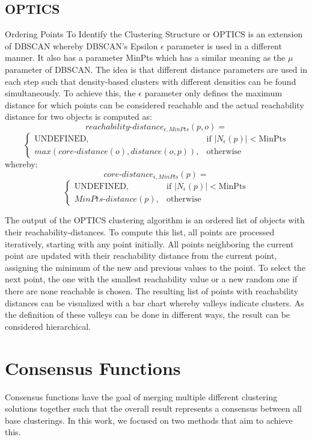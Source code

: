 \documentclass[
	a4paper,
	english,
	twoside,
	openright,               
	11pt                            
	]{report}
\begin{document}
\subsection{OPTICS}\label{sec:opticstheory}
Ordering Points To Identify the Clustering Structure or OPTICS \cite{10.1145/304181.304187} is an extension of DBSCAN whereby DBSCAN's Epsilon $\epsilon$ parameter is used in a different manner. It also has a parameter MinPts which has a similar meaning as the $\mu$ parameter of DBSCAN. The idea is that different distance parameters are used in each step such that density-based clusters with different densities can be found simultaneously. To achieve this, the  $\epsilon$ parameter only defines the maximum distance for which points can be considered reachable and the actual reachability distance for two objects is computed as:
$$reachability\text{-}distance_{\epsilon,MinPts}(p,o)=$$
$$
\begin{cases}
    \text{UNDEFINED},& \text{if } |N_\epsilon(p)|< \text{MinPts}\\
    max(core\text{-}distance(o),distance(o,p)),              & \text{otherwise}
\end{cases}
$$
whereby:
$$core\text{-}distance_{\epsilon,MinPts}(p)=$$
$$
\begin{cases}
    \text{UNDEFINED},& \text{if } |N_\epsilon(p)|< \text{MinPts}\\
    MinPts\text{-}distance(p),              & \text{otherwise}
\end{cases}
$$

The output of the OPTICS clustering algorithm is an ordered list of objects with their reachability-distances. To compute this list, all points are processed iteratively, starting with any point initially. All points neighboring the current point are updated with their reachability distance from the current point, assigning the minimum of the new and previous values to the point. To select the next point, the one with the smallest reachability value or a new random one if there are none reachable is chosen. The resulting list of points with reachability distances can be visualized with a bar chart whereby valleys indicate clusters. As the definition of these valleys can be done in different ways, the result can be considered hierarchical.


\section{Consensus Functions}
Consensus functions have the goal of merging multiple different clustering solutions together such that the overall result represents a consensus between all base clusterings. In this work, we focused on two methods that aim to achieve this.
\end{document}

